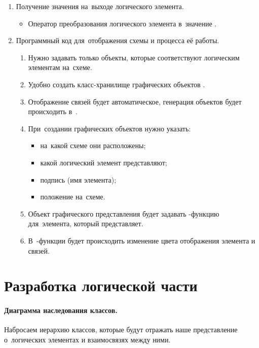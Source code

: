\begin{enumerate}
  \item Получение значения на~выходе логического элемента.
  \begin{itemize}
    \item Оператор преобразования логического элемента в~значение .
  \end{itemize}

  \item Программный код для~отображения схемы и процесса её работы.
  \begin{enumerate}
    \item Нужно задавать только объекты, которые соответствуют логическим элементам на~схеме.
    \item Удобно создать класс-хранилище графических объектов .
    \item Отображение связей будет автоматическое, генерация объектов будет происходить в~.
    \item При~создании графических объектов нужно указать:
    \begin{itemize}
      \item на~какой схеме они расположены;
      \item какой логический элемент представляют;
      \item подпись (имя элемента);
      \item положение на~схеме.
    \end{itemize}
    \item Объект графического представления будет задавать -функцию для~элемента, который представляет.
    \item В~-функции будет происходить изменение цвета отображения элемента и связей.
  \end{enumerate}
\end{enumerate}



\section{Разработка логической части}
\paragraph{Диаграмма наследования классов.}
Набросаем иерархию классов, которые будут отражать наше представление о~логических элементах и взаимосвязях между ними.

